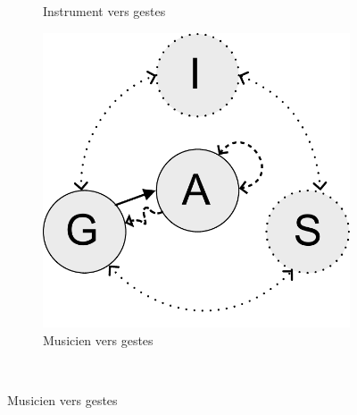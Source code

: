 \begin{figure}[!htbp]
{\begin{subfigure}[b]{.33\textwidth}
			\caption{Instrument vers gestes}
		\end{subfigure}%
		\hspace{.02\linewidth}
		\begin{subfigure}[b]{.33\textwidth}
			\centering
			\includegraphics[width=0.9\linewidth]{gfx/03_gesture/gesture-inference-c.pdf}
			\caption{Musicien vers gestes}
		\end{subfigure}%
	}\\
\end{figure}
